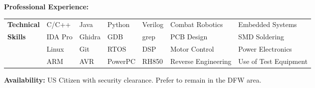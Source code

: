\documentclass[11pt]{article}
\begin{document}
\thispagestyle{empty}

\textbf{Professional Experience:}\\

\vspace{0.5em}

\vspace{0.5em}
%

\vspace{1.0em}

\vspace{0.5em}

\vspace{0.5em}
\begin{tabular}{@{}l l l l l l l}
    \textbf{Technical} & C/C++ & Java & Python & Verilog & Combat Robotics & Embedded Systems \\
    \textbf{Skills}    & IDA Pro & Ghidra & GDB & grep & PCB Design & SMD Soldering \\
                       & Linux & Git & RTOS & DSP & Motor Control & Power Electronics \\
                       & ARM & AVR & PowerPC & RH850 & Reverse Engineering & Use of Test Equipment\\
\end{tabular}

\vspace{0.5em}
\textbf{Availability:} US Citizen with security clearance. Prefer to remain in the DFW area.
\end{document}
